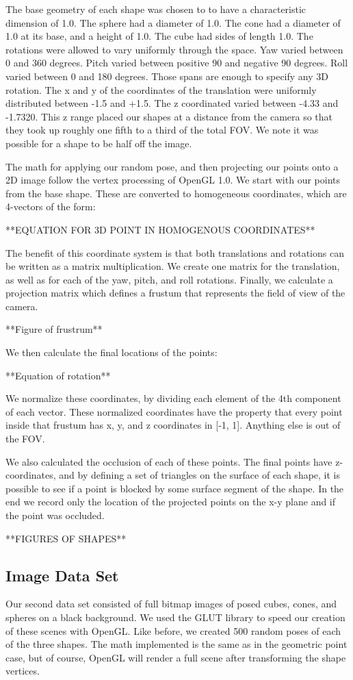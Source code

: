 \documentclass[journal]{IEEEtran}
\begin{document}
The base geometry of each shape was chosen to to have a characteristic dimension of 1.0. The sphere had a diameter of 1.0. The cone had a diameter of 1.0 at its base, and a height of 1.0. The cube had sides of length 1.0. The rotations were allowed to vary uniformly through the space. Yaw varied between 0 and 360 degrees. Pitch varied between positive 90 and negative 90 degrees. Roll varied between 0 and 180 degrees. Those spans are enough to specify any 3D rotation. The x and y of the coordinates of the translation were uniformly distributed between -1.5 and +1.5. The z coordinated varied between -4.33 and -1.7320. This z range placed our shapes at a distance from the camera so that they took up roughly one fifth to a third of the total FOV. We note it was possible for a shape to be half off the image.

The math for applying our random pose, and then projecting our points onto a 2D image follow the vertex processing of OpenGL 1.0. We start with our points from the base shape. These are converted to homogeneous coordinates, which are 4-vectors of the form:

**EQUATION FOR 3D POINT IN HOMOGENOUS COORDINATES**

The benefit of this coordinate system is that both translations and rotations can be written as a matrix multiplication. We create one matrix for the translation, as well as for each of the yaw, pitch, and roll rotations. Finally, we calculate a projection matrix which defines a frustum that represents the field of view of the camera.

**Figure of frustrum**

We then calculate the final locations of the points:

**Equation of rotation**

We normalize these coordinates, by dividing each element of the 4th component of each vector. These normalized coordinates have the property that every point inside that frustum has x, y, and z coordinates in [-1, 1]. Anything else is out of the FOV.

We also calculated the occlusion of each of these points. The final points have z-coordinates, and by defining a set of triangles on the surface of each shape, it is possible to see if a point is blocked by some surface segment of the shape. In the end we record only the location of the projected points on the x-y plane and if the point was occluded.

**FIGURES OF SHAPES**

\subsection{Image Data Set}
Our second data set consisted of full bitmap images of posed cubes, cones, and spheres on a black background. We used the GLUT library to speed our creation of these scenes with OpenGL. Like before, we created 500 random poses of each of the three shapes. The math implemented is the same as in the geometric point case, but of course, OpenGL will render a full scene after transforming the shape vertices.
\end{document}
